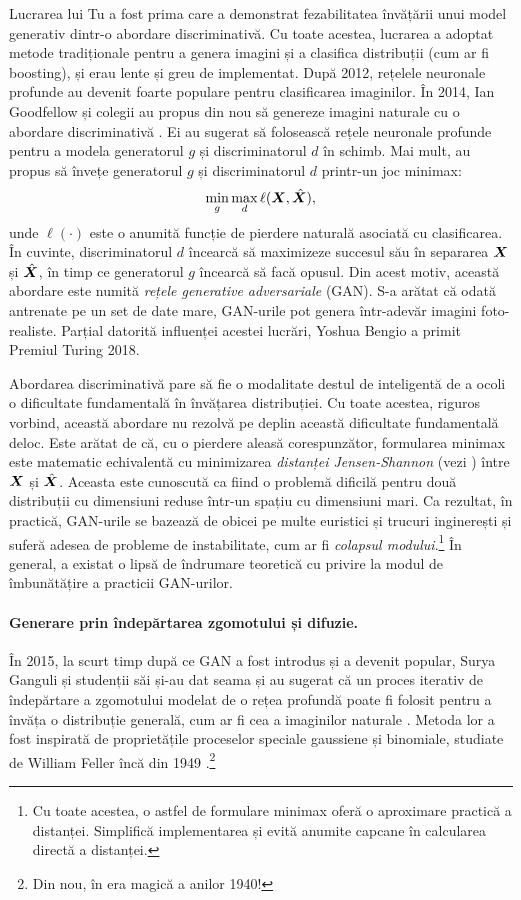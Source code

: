 \documentclass[../../book-main_ro.tex]{subfiles}
\begin{document}
Lucrarea lui Tu \cite{Tu-2007} a fost prima care a demonstrat fezabilitatea învățării unui model generativ dintr-o abordare discriminativă. Cu toate acestea, lucrarea a adoptat metode tradiționale pentru a genera imagini și a clasifica distribuții (cum ar fi boosting), și erau lente și greu de implementat. După 2012, rețelele neuronale profunde au devenit foarte populare pentru clasificarea imaginilor. În 2014, Ian Goodfellow și colegii au propus din nou să genereze imagini naturale cu o abordare discriminativă \cite{Goodfellow-2014}. Ei au sugerat să folosească rețele neuronale profunde pentru a modela generatorul $g$ și discriminatorul $d$ în schimb. Mai mult, au propus să învețe generatorul $g$ și discriminatorul $d$ printr-un joc minimax:
\begin{equation}
    \min_g \max_d \ell(\bm{X}, \hat {\bm{X}}),
\end{equation}
unde $\ell(\cdot)$ este o anumită funcție de pierdere naturală asociată cu clasificarea. În cuvinte, discriminatorul $d$ încearcă să maximizeze succesul său în separarea $\bm{X}$ și $\hat {\bm{X}}$, în timp ce generatorul $g$ încearcă să facă opusul. Din acest motiv, această abordare este numită {\em rețele generative adversariale} (GAN). S-a arătat că odată antrenate pe un set de date mare, GAN-urile pot genera într-adevăr imagini foto-realiste. Parțial datorită influenței acestei lucrări, Yoshua Bengio a primit Premiul Turing 2018.

Abordarea discriminativă pare să fie o modalitate destul de inteligentă de a ocoli o dificultate fundamentală în învățarea distribuției. Cu toate acestea, riguros vorbind, această abordare nu rezolvă pe deplin această dificultate fundamentală deloc. Este arătat de \cite{Goodfellow-2014} că, cu o pierdere aleasă corespunzător, formularea minimax este matematic echivalentă cu minimizarea {\em distanței Jensen-Shannon} (vezi \cite{Cover-Thomas}) între $\bm{X}$ și $\hat {\bm{X}}$. Aceasta este cunoscută ca fiind o problemă dificilă pentru două distribuții cu dimensiuni reduse într-un spațiu cu dimensiuni mari. Ca rezultat, în practică, GAN-urile se bazează de obicei pe multe euristici și trucuri inginerești și suferă adesea de probleme de instabilitate, cum ar fi {\em colapsul modului}.\footnote{Cu toate acestea, o astfel de formulare minimax oferă o aproximare practică a distanței. Simplifică implementarea și evită anumite capcane în calcularea directă a distanței.} În general, a existat o lipsă de îndrumare teoretică cu privire la modul de îmbunătățire a practicii GAN-urilor.

\paragraph{Generare prin îndepărtarea zgomotului și difuzie.}
În 2015, la scurt timp după ce GAN a fost introdus și a devenit popular, Surya Ganguli și studenții săi și-au dat seama și au sugerat că un proces iterativ de îndepărtare a zgomotului modelat de o rețea profundă poate fi folosit pentru a învăța o distribuție generală, cum ar fi cea a imaginilor naturale \cite{Sohl-Dickstein2015}. Metoda lor a fost inspirată de proprietățile proceselor speciale gaussiene și binomiale, studiate de William Feller încă din 1949 \cite{Feller1949OnTT}.\footnote{Din nou, în era magică a anilor 1940!}
\end{document}
